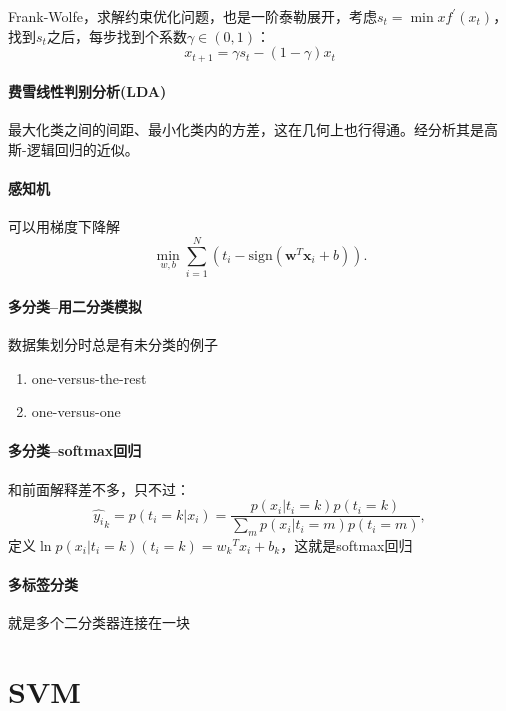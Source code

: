 Frank-Wolfe，求解约束优化问题，也是一阶泰勒展开，考虑$s_t = \min xf^\prime(x_t)$，找到$s_t$之后，每步找到个系数$\gamma \in (0,1)$：
$$x_{t+1} = \gamma s_t - (1-\gamma)x_t$$

\paragraph{费雪线性判别分析(LDA)} 最大化类之间的间距、最小化类内的方差，这在几何上也行得通。经分析其是高斯-逻辑回归的近似。

\paragraph{感知机} 可以用梯度下降解
$$\min_{w,b} \sum_{i=1}^N (t_i - \mathrm{sign}(\bm w^T\bm x_i + b)).$$

\paragraph{多分类--用二分类模拟}数据集划分时总是有未分类的例子
\begin{enumerate}
\item one-versus-the-rest
\item one-versus-one
\end{enumerate}

\paragraph{多分类--softmax回归} 
和前面解释差不多，只不过：
$$\hat{y_i}_k = p(t_i = k|x_i) = \frac{p(x_i|t_i = k)p(t_i = k)}{\sum_m p(x_i|t_i = m)p(t_i = m)},$$
定义$\ln p(x_i|t_i = k)(t_i = k) = {w_k}^Tx_i + b_k$，这就是softmax回归

\paragraph{多标签分类} 就是多个二分类器连接在一块

\section{SVM}
